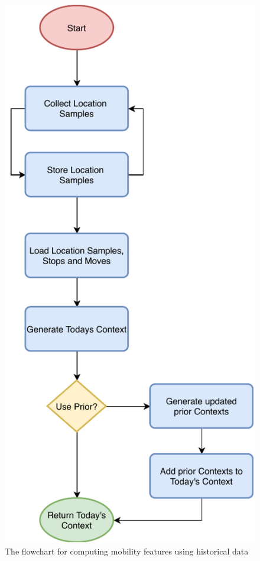 \begin{figure}
    \centering
    \includegraphics[width=\textwidth]{images/diagrams/api-flowchart.pdf}
    \caption{The flowchart for computing mobility features using historical data}
    \label{fig:flowchart-features}
\end{figure}


